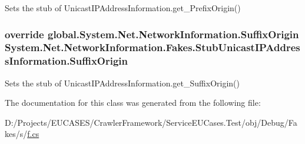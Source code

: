 Sets the stub of Unicast\-I\-P\-Address\-Information.\-get\-\_\-\-Prefix\-Origin()

\hypertarget{class_system_1_1_net_1_1_network_information_1_1_fakes_1_1_stub_unicast_i_p_address_information_a8e33b78739b68f03417186388344d225}{
\subsubsection[{Suffix\-Origin}]{\setlength{\rightskip}{0pt plus 5cm}override global.\-System.\-Net.\-Network\-Information.\-Suffix\-Origin System.\-Net.\-Network\-Information.\-Fakes.\-Stub\-Unicast\-I\-P\-Address\-Information.\-Suffix\-Origin\hspace{0.3cm}{\ttfamily [get]}}}\label{class_system_1_1_net_1_1_network_information_1_1_fakes_1_1_stub_unicast_i_p_address_information_a8e33b78739b68f03417186388344d225}


Sets the stub of Unicast\-I\-P\-Address\-Information.\-get\-\_\-\-Suffix\-Origin()



The documentation for this class was generated from the following file\-:\begin{DoxyCompactItemize}
\item 
D\-:/\-Projects/\-E\-U\-C\-A\-S\-E\-S/\-Crawler\-Framework/\-Service\-E\-U\-Cases.\-Test/obj/\-Debug/\-Fakes/s/\hyperlink{s_2f_8cs}{f.\-cs}\end{DoxyCompactItemize}
